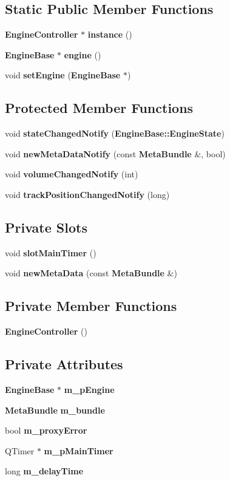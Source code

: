 \subsection*{Static Public Member Functions}
\begin{CompactItemize}
\item 
{\bf Engine\-Controller} $\ast$ {\bf instance} ()
\item 
{\bf Engine\-Base} $\ast$ {\bf engine} ()
\item 
void {\bf set\-Engine} ({\bf Engine\-Base} $\ast$)
\end{CompactItemize}
\subsection*{Protected Member Functions}
\begin{CompactItemize}
\item 
void {\bf state\-Changed\-Notify} ({\bf Engine\-Base::Engine\-State})
\item 
void {\bf new\-Meta\-Data\-Notify} (const {\bf Meta\-Bundle} \&, bool)
\item 
void {\bf volume\-Changed\-Notify} (int)
\item 
void {\bf track\-Position\-Changed\-Notify} (long)
\end{CompactItemize}
\subsection*{Private Slots}
\begin{CompactItemize}
\item 
void {\bf slot\-Main\-Timer} ()
\item 
void {\bf new\-Meta\-Data} (const {\bf Meta\-Bundle} \&)
\end{CompactItemize}
\subsection*{Private Member Functions}
\begin{CompactItemize}
\item 
{\bf Engine\-Controller} ()
\end{CompactItemize}
\subsection*{Private Attributes}
\begin{CompactItemize}
\item 
{\bf Engine\-Base} $\ast$ {\bf m\_\-p\-Engine}
\item 
{\bf Meta\-Bundle} {\bf m\_\-bundle}
\item 
bool {\bf m\_\-proxy\-Error}
\item 
QTimer $\ast$ {\bf m\_\-p\-Main\-Timer}
\item 
long {\bf m\_\-delay\-Time}
\end{CompactItemize}
